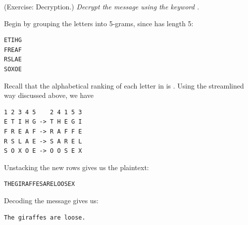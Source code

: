 \documentclass[letterpaper]{article}
\begin{document}
\begin{mdframed}[nobreak=true]
    (Exercise: Decryption.) \emph{Decrypt the message  using the keyword .}

    \begin{mdframed}
        Begin by grouping the letters into 5-grams, since  has length 5:
        \begin{mdframed}
            \begin{verbatim}
ETIHG
FREAF
RSLAE
SOXOE\end{verbatim}
        \end{mdframed}
        Recall that the alphabetical ranking of each letter in  is . Using the streamlined way discussed above, we have 
        \begin{mdframed}
            \begin{verbatim}
1 2 3 4 5    2 4 1 5 3
E T I H G -> T H E G I 
F R E A F -> R A F F E 
R S L A E -> S A R E L 
S O X O E -> O O S E X \end{verbatim}
        \end{mdframed}
        Unstacking the new rows gives us the plaintext:
        \begin{mdframed}
            \begin{verbatim}
THEGIRAFFESARELOOSEX\end{verbatim}
        \end{mdframed}
        Decoding the message gives us: 
        \begin{mdframed}
            \begin{verbatim}
The giraffes are loose.\end{verbatim}
        \end{mdframed}
    \end{mdframed}

\end{mdframed}
\end{document}
